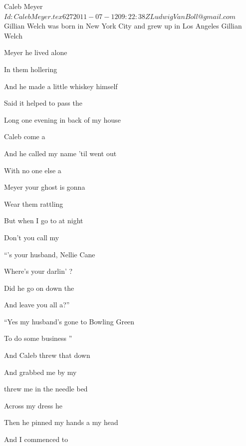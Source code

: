 \begin{SBSong}{Caleb Meyer}
  {$Id: CalebMeyer.tex 627 2011-07-12 09:22:38Z LudwigVanBoll@gmail.com $}
  {Gillian Welch was born in New York City and grew up in Los Angeles}
  {Gillian Welch}
  \begin{SBVerse}
     Meyer he lived alone

    In them hollering 

    And he made a little whiskey  himself

    Said it helped to pass the 

    Long one evening in back of my house

    Caleb come a

    And he called my name 'til  went out

    With no one else a
  \end{SBVerse}
  \begin{SBChorus}
     Meyer your ghost is gonna

    Wear them rattling 

    But when I go to  at night

    Don't you call my 
  \end{SBChorus}
  \begin{SBVerse}
    ``'s your husband, Nellie Cane

    Where's your darlin' ?

    Did he go on down the 

    And leave you all a?''

    ``Yes my husband's gone to Bowling Green

    To do some business ''

    And Caleb threw that  down

    And grabbed me by my 
  \end{SBVerse}
  \CBPageBrk
  \begin{SBVerse}
     threw me in the needle bed

    Across my dress he 

    Then he pinned my hands a my head

    And I commenced to 


\end{SBVerse}
\end{SBSong}
